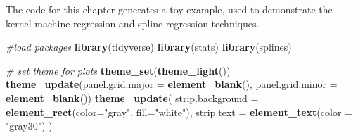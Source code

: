 \documentclass[12pt, twoside]{amherstthesis}
\newenvironment{Shaded}{\begin{snugshade}}{\end{snugshade}}
\newcommand{\AttributeTok}[1]{\textcolor[rgb]{0.13,0.29,0.53}{#1}}
\newcommand{\CommentTok}[1]{\textcolor[rgb]{0.56,0.35,0.01}{\textit{#1}}}
\newcommand{\FunctionTok}[1]{\textcolor[rgb]{0.13,0.29,0.53}{\textbf{#1}}}
\newcommand{\NormalTok}[1]{#1}
\newcommand{\StringTok}[1]{\textcolor[rgb]{0.31,0.60,0.02}{#1}}
\begin{document}
The code for this chapter generates a toy example, used to demonstrate the kernel machine regression and spline regression techniques.
\begin{Shaded}
\begin{Highlighting}[]
\CommentTok{\#load packages}
\FunctionTok{library}\NormalTok{(tidyverse)}
\FunctionTok{library}\NormalTok{(stats)}
\FunctionTok{library}\NormalTok{(splines)}
\end{Highlighting}
\end{Shaded}
\begin{Shaded}
\begin{Highlighting}[]
\CommentTok{\# set theme for plots}
\FunctionTok{theme\_set}\NormalTok{(}\FunctionTok{theme\_light}\NormalTok{())}
\FunctionTok{theme\_update}\NormalTok{(}\AttributeTok{panel.grid.major =} \FunctionTok{element\_blank}\NormalTok{(), }
             \AttributeTok{panel.grid.minor =} \FunctionTok{element\_blank}\NormalTok{())}
\FunctionTok{theme\_update}\NormalTok{(}
  \AttributeTok{strip.background =} \FunctionTok{element\_rect}\NormalTok{(}\AttributeTok{color=}\StringTok{"gray"}\NormalTok{, }\AttributeTok{fill=}\StringTok{"white"}\NormalTok{), }
  \AttributeTok{strip.text =} \FunctionTok{element\_text}\NormalTok{(}\AttributeTok{color =} \StringTok{"gray30"}\NormalTok{)}
\NormalTok{  )}
\end{Highlighting}
\end{Shaded}
\end{document}
